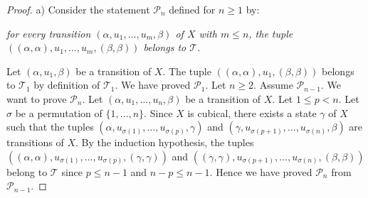 \documentclass[a4paper,12pt]{amsart}
\begin{document}
\begin{proof} {a)} Consider the statement $\mathcal{P}_n$ defined for $n{\geqslant} 1$ by:
\begin{center}
\emph{
  for every transition $(\alpha,u_1,\dots,u_m,\beta)$ of $X$ with
  $m{\leqslant} n$, the tuple $((\alpha,\alpha),u_1,\dots,u_m,(\beta,\beta))$
  belongs to $\mathcal{T}$.}
\end{center} Let $(\alpha,u_1,\beta)$ be a transition of $X$. The
tuple $((\alpha,\alpha),u_1,(\beta,\beta))$ belongs to $\mathcal{T}_1$ by
definition of $\mathcal{T}_1$. We have proved $\mathcal{P}_1$. Let $n{\geqslant}
2$. Assume $\mathcal{P}_{n-1}$. We want to prove $\mathcal{P}_n$. Let
$(\alpha,u_1,\dots,u_n,\beta)$ be a transition of $X$. Let $1{\leqslant} p
<n$. Let $\sigma$ be a permutation of $\{1,\dots,n\}$. Since $X$ is
cubical, there exists a state $\gamma$ of $X$ such that the tuples
$(\alpha,u_{\sigma(1)},\dots,u_{\sigma(p)},\gamma)$ and
$(\gamma,u_{\sigma(p+1)},\dots,u_{\sigma(n)},\beta)$ are transitions
of $X$. By the induction hypothesis, the tuples
$((\alpha,\alpha),u_{\sigma(1)},\dots,u_{\sigma(p)},(\gamma,\gamma))$
and
$((\gamma,\gamma),u_{\sigma(p+1)},\dots,u_{\sigma(n)},(\beta,\beta))$
belong to $\mathcal{T}$ since $p{\leqslant} n-1$ and $n-p {\leqslant} n-1$. Hence we have
proved $\mathcal{P}_n$ from $\mathcal{P}_{n-1}$.


\end{proof}
\end{document}
